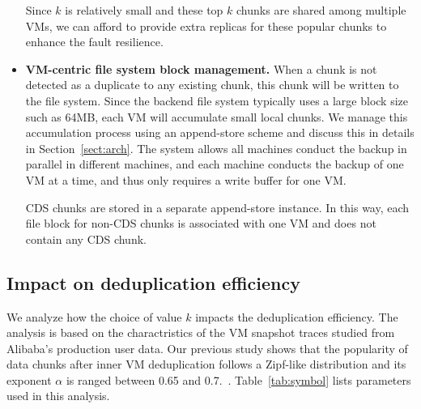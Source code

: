 \begin{itemize}
Since $k$ is relatively small and these top $k$ chunks are shared among multiple VMs, 
we can afford to provide extra replicas for these popular chunks to enhance the fault resilience.

\item \textbf{VM-centric file system block management.}
When a chunk is not detected as a duplicate to any existing chunk, this chunk will be written
to the file system. Since the backend file system typically uses a large block size such as 64MB, each VM will 
accumulate small local chunks. We manage this accumulation process using an append-store  scheme
and discuss this in details in Section~\ref{sect:arch}.
The system allows all machines conduct the backup in parallel in different machines, and each machine
conducts the backup of one VM at a time, and thus only requires a write  buffer for one VM.

CDS chunks are stored in a separate
append-store instance. In this way, each file block for non-CDS chunks is associated with one VM
and does not contain any CDS chunk. 
\end{itemize}

 \subsection{Impact on deduplication efficiency}




We analyze how the choice of value  $k$ impacts the deduplication efficiency.
The analysis is based on the charactristics  of the VM snapshot traces
studied from  Alibaba's production user data.
Our previous study shows that the popularity of data chunks after inner VM deduplication follows 
a Zipf-like distribution\cite{zipf} and its
exponent $\alpha$ is ranged between 0.65  and  0.7.~\cite{ieeecloud}. 
Table~\ref{tab:symbol} lists parameters used in this analysis.


